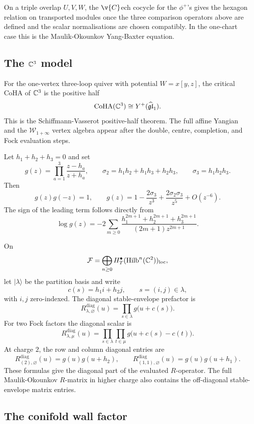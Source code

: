 On a triple overlap \(U,V,W\), the \(\v{C}\)ech cocycle for the
\(\phi^+\)'s gives the hexagon relation on transported modules once the
three comparison operators above are defined and the scalar
normalisations are chosen compatibly. In the one-chart case this is the
Maulik-Okounkov Yang-Baxter equation.

\subsection*{The \(\mathbb C^3\) model}

For the one-vertex three-loop quiver with potential \(W=x[y,z]\), the
critical CoHA of \(\mathbb C^3\) is the positive half
\[
  \mathrm{CoHA}(\mathbb C^3)\cong Y^+(\widehat{\mathfrak{gl}}_1).
\]
This is the Schiffmann-Vasserot positive-half theorem. The full affine
Yangian and the \(\mathcal W_{1+\infty}\) vertex algebra appear
after the double, centre, completion, and Fock evaluation steps.

Let \(h_1+h_2+h_3=0\) and set
\[
  g(z)=\prod_{a=1}^3\frac{z-h_a}{z+h_a},
  \qquad
  \sigma_2=h_1h_2+h_1h_3+h_2h_3,
  \qquad
  \sigma_3=h_1h_2h_3 .
\]
Then
\[
  g(z)g(-z)=1,\qquad
  g(z)=1-\frac{2\sigma_3}{z^3}
        +\frac{2\sigma_2\sigma_3}{z^5}
        +O(z^{-6}).
\]
The sign of the leading term follows directly from
\[
  \log g(z)
  =
  -2\sum_{m\geq0}\frac{h_1^{2m+1}+h_2^{2m+1}+h_3^{2m+1}}
  {(2m+1)z^{2m+1}} .
\]

On
\[
  \mathcal F=\bigoplus_{n\geq0}H_T^\bullet(\mathrm{Hilb}^n(\mathbb C^2))_{\mathrm{loc}},
\]
let \(|\lambda\rangle\) be the partition basis and write
\[
  c(s)=h_1 i+h_2 j,\qquad s=(i,j)\in\lambda,
\]
with \(i,j\) zero-indexed. The diagonal stable-envelope prefactor is
\[
  R^{\mathrm{diag}}_{\lambda,\varnothing}(u)
  =
  \prod_{s\in\lambda}g\bigl(u+c(s)\bigr).
\]
For two Fock factors the diagonal scalar is
\[
  R^{\mathrm{diag}}_{\lambda,\mu}(u)
  =
  \prod_{s\in\lambda}\prod_{t\in\mu}
  g\bigl(u+c(s)-c(t)\bigr).
\]
At charge \(2\), the row and column diagonal entries are
\[
  R^{\mathrm{diag}}_{(2),\varnothing}(u)
  =
  g(u)g(u+h_2),
  \qquad
  R^{\mathrm{diag}}_{(1,1),\varnothing}(u)
  =
  g(u)g(u+h_1).
\]
These formulas give the diagonal part of the evaluated \(R\)-operator.
The full Maulik-Okounkov \(R\)-matrix in higher charge also contains
the off-diagonal stable-envelope matrix entries.

\subsection*{The conifold wall factor}

